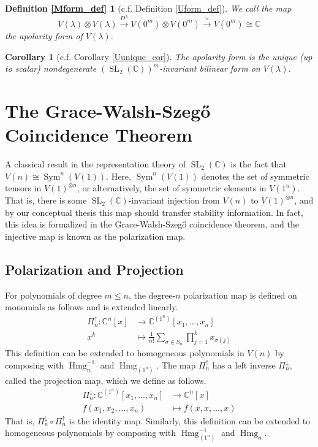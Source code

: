 \documentclass{article}
\newtheorem{corollary}[theorem]{Corollary}
\theoremstyle{definition}
\theoremstyle{plain}
\newcommand{\C}{\mathbb{C}}
\DeclareMathOperator{\Hmg}{Hmg}
\DeclareMathOperator{\SL}{SL}
\begin{document}
\newtheorem*{Mform_def}{Definition \ref{Mform_def}}
\begin{Mform_def}[c.f. Definition \ref{Uform_def}]
    We call the map
    \[
        V(\lambda) \otimes V(\lambda) \xrightarrow{D^\lambda} V(0^m) \otimes V(0^m) \xrightarrow{\times} V(0^m) \cong \C
    \]
    the \emph{apolarity form} of $V(\lambda)$.
\end{Mform_def}

\begin{corollary}[c.f. Corollary \ref{Uunique_cor}]\label{Munique_cor}
    The apolarity form is the unique (up to scalar) nondegenerate $(\SL_2(\C))^m$-invariant bilinear form on $V(\lambda)$.
\end{corollary}


\section{The Grace-Walsh-Szeg\texorpdfstring{\H{o}}{o} Coincidence Theorem}\label{gws_app}

A classical result in the representation theory of $\SL_2(\C)$ is the fact that $V(n) \cong \operatorname{Sym}^n(V(1))$. Here, $\operatorname{Sym}^n(V(1))$ denotes the set of symmetric tensors in $V(1)^{\otimes n}$, or alternatively, the set of symmetric elements in $V(1^n)$. That is, there is some $\SL_2(\C)$-invariant injection from $V(n)$ to $V(1)^{\otimes n}$, and by our conceptual thesis this map should transfer stability information. In fact, this idea is formalized in the Grace-Walsh-Szeg{\H{o}} coincidence theorem, and the injective map is known as the polarization map.

\subsection{Polarization and Projection}

For polynomials of degree $m \leq n$, the degree-$n$ polarization map is defined on monomials as follows and is extended linearly.
\[
    \begin{split}
        \Pi_n^\uparrow : \C^n[x] &\rightarrow \C^{(1^n)}[x_1,\ldots,x_n] \\
        x^k &\mapsto \frac{1}{n!} \sum_{\sigma \in S_n} \prod_{j=1}^k x_{\sigma(j)}
    \end{split}
\]
This definition can be extended to homogeneous polynomials in $V(n)$ by composing with $\Hmg_n^{-1}$ and $\Hmg_{(1^n)}$. The map $\Pi_n^\uparrow$ has a left inverse $\Pi_n^\downarrow$, called the projection map, which we define as follows.
\[
    \begin{split}
        \Pi_n^\downarrow : \C^{(1^n)}[x_1,\ldots,x_n] &\rightarrow \C^n[x] \\
        f(x_1,x_2,\ldots,x_n) &\mapsto f(x,x,\ldots,x)
    \end{split}
\]
That is, $\Pi_n^\downarrow \circ \Pi_n^\uparrow$ is the identity map. Similarly, this definition can be extended to homogeneous polynomials by composing with $\Hmg_{(1^n)}^{-1}$ and $\Hmg_n$.
\end{document}
